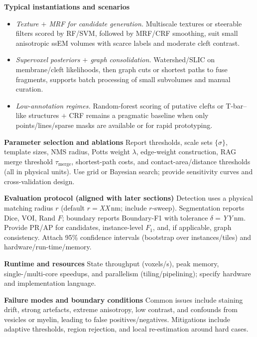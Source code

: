 \medskip
\noindent\textbf{Typical instantiations and scenarios}\;
\begin{itemize}\setlength\itemsep{0.25em}
  \item \emph{Texture \(+\) MRF for candidate generation.} Multiscale textures or steerable filters scored by RF/SVM, followed by MRF/CRF smoothing, suit small anisotropic ssEM volumes with scarce labels and moderate cleft contrast.
  \item \emph{Supervoxel posteriors \(+\) graph consolidation.} Watershed/SLIC on membrane/cleft likelihoods, then graph cuts or shortest paths to fuse fragments, supports batch processing of small subvolumes and manual curation.
  \item \emph{Low-annotation regimes.} Random-forest scoring of putative clefts or T-bar–like structures \(+\) CRF remains a pragmatic baseline when only points/lines/sparse masks are available or for rapid prototyping.
\end{itemize}

\medskip
\noindent\textbf{Parameter selection and ablations}\;
Report thresholds, scale sets \(\{\sigma\}\), template sizes, NMS radius, Potts weight \(\lambda\), edge-weight construction, RAG merge threshold \(\tau_{\text{merge}}\), shortest-path costs, and contact-area/distance thresholds (all in physical units).
Use grid or Bayesian search; provide sensitivity curves and cross-validation design.

\medskip
\noindent\textbf{Evaluation protocol (aligned with later sections)}\;
Detection uses a physical matching radius \(r\) (default \(r=\)\textit{XX}\,nm; include \(r\)-sweep).
Segmentation reports Dice, VOI, Rand \(F\); boundary reports Boundary-F1 with tolerance \(\delta=\)\textit{YY}\,nm.
Provide PR/AP for candidates, instance-level \(F_1\), and, if applicable, graph consistency.
Attach 95\% confidence intervals (bootstrap over instances/tiles) and hardware/run-time/memory.

\medskip
\noindent\textbf{Runtime and resources}\;
State throughput (voxels/s), peak memory, single-/multi-core speedups, and parallelism (tiling/pipelining); specify hardware and implementation language.

\medskip
\noindent\textbf{Failure modes and boundary conditions}\;
Common issues include staining drift, strong artefacts, extreme anisotropy, low contrast, and confounds from vesicles or myelin, leading to false positives/negatives.
Mitigations include adaptive thresholds, region rejection, and local re-estimation around hard cases.

